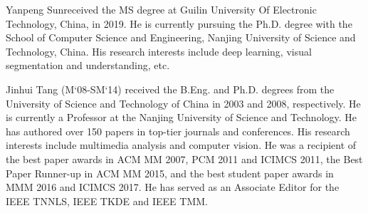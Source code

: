 \documentclass[10pt,journal,cspaper,compsoc]{IEEEtran}
\begin{document}
\begin{IEEEbiography} {Yanpeng Sun}received the MS degree at Guilin University Of Electronic Technology, China, in 2019. He is currently pursuing the Ph.D. degree with the School of Computer Science and Engineering, Nanjing University of Science and Technology, China. His research interests include deep learning, visual segmentation and understanding, etc.
\end{IEEEbiography}
	
\begin{IEEEbiography} {Jinhui Tang} (M`08-SM`14) received the B.Eng. and Ph.D. degrees from the University of Science and Technology of China in 2003 and 2008, respectively. He is currently a Professor at the Nanjing University of Science and Technology. He has authored over 150 papers in top-tier journals and conferences. His research interests include multimedia analysis and computer vision. He was a recipient of the best paper awards in ACM MM 2007, PCM 2011 and ICIMCS 2011, the Best Paper Runner-up in ACM MM 2015, and the best student paper awards in MMM 2016 and ICIMCS 2017. He has served as an Associate Editor for the IEEE TNNLS, IEEE TKDE and IEEE TMM.
\end{IEEEbiography}
	
	
\end{document}

